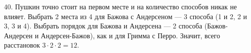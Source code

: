 40. Пушкин точно стоит на первом месте и на количество способов никак не влияет. Выбрать 2 места из 4 для Бажова с Андерсеном --- 3 способа (1 и 2, 2 и 3, 3 и 4). Выбрать порядок для Бажова и Андерсена --- 2 способа (Бажов-Андерсен и Андерсен-Бажов), как и для  Гримма с Перро. Значит, всего расстановок $3\cdot2\cdot2=12.$\\
